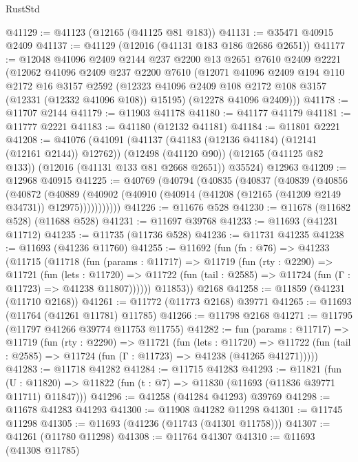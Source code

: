 \begin{lexlean}{RustStd}
\begin{coremodule}
@41129 := @41123 (@12165 (@41125 @81 @183))
@41131 := @35471 @40915 @2409
@41137 := @41129 (@12016 (@41131 @183 @186 @2686 @2651))
@41177 := @12048
    @41096
    @2409
    @2144
    @237
    @2200
    @13
    @2651
    @7610
    @2409
    @2221
    (@12062
      @41096
      @2409
      @237
      @2200
      @7610
      (@12071
        @41096
        @2409
        @194
        @110
        @2172
        @16
        @3157
        @2592
        (@12323 @41096 @2409 @108 @2172 @108 @3157 (@12331 (@12332 @41096 @108)) @15195)
        (@12278 @41096 @2409)))
@41178 := @11707 @2144
@41179 := @11903 @41178
@41180 := @41177 @41179
@41181 := @11777 @2221
@41183 := @41180 (@12132 @41181)
@41184 := @11801 @2221
@41208 := @41076
    (@41091
      (@41137 (@41183 (@12136 @41184) (@12141 (@12161 @2144)) @12762))
      (@12498 (@41120 @90))
      (@12165 (@41125 @82 @133))
      (@12016 (@41131 @133 @81 @2668 @2651))
      @35524)
    @12963
@41209 := @12968 @40915
@41225 := @40769
    (@40794
      (@40835
        (@40837
          (@40839
            (@40856
              (@40872
                (@40889
                  (@40902 (@40910 (@40914 (@41208 (@12165 (@41209 @2149 @34731)) @12975)))))))))))
@41226 := @11676 @528
@41230 := @11678 (@11682 @528) (@11688 @528)
@41231 := @11697 @39768
@41233 := @11693 (@41231 @11712)
@41235 := @11735 (@11736 @528)
@41236 := @11731 @41235
@41238 := @11693 (@41236 @11760)
@41255 := @11692
    (fun (fn : @76) =>
    @41233
      (@11715
        (@11718
          (fun (params : @11717) =>
          @11719
            (fun (rty : @2290) =>
            @11721
              (fun (lets : @11720) =>
              @11722 (fun (tail : @2585) => @11724 (fun (Γ : @11723) => @41238 @11807))))))
        @11853))
    @2168
@41258 := @11859 (@41231 (@11710 @2168))
@41261 := @11772 (@11773 @2168) @39771
@41265 := @11693 (@11764 (@41261 @11781) @11785)
@41266 := @11798 @2168
@41271 := @11795 (@11797 @41266 @39774 @11753 @11755)
@41282 := fun (params : @11717) =>
  @11719
    (fun (rty : @2290) =>
    @11721
      (fun (lets : @11720) =>
      @11722 (fun (tail : @2585) => @11724 (fun (Γ : @11723) => @41238 (@41265 @41271)))))
@41283 := @11718 @41282
@41284 := @11715 @41283
@41293 := @11821
    (fun (U : @11820) => @11822 (fun (t : @7) => @11830 (@11693 (@11836 @39771 @11711) @11847)))
@41296 := @41258 (@41284 @41293) @39769
@41298 := @11678 @41283 @41293
@41300 := @11908 @41282 @11298
@41301 := @11745 @11298
@41305 := @11693 (@41236 (@11743 (@41301 @11758)))
@41307 := @41261 (@11780 @11298)
@41308 := @11764 @41307
@41310 := @11693 (@41308 @11785)

\end{coremodule}
\end{lexlean}
